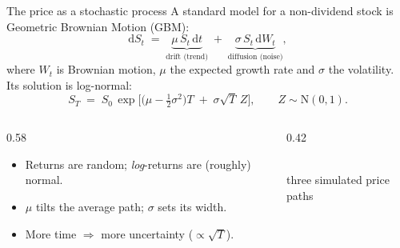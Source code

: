 \documentclass[11pt,aspectratio=169]{beamer}
\newcommand{\dd}{\mathrm{d}}                %
\newcommand{\Ncdf}{\mathrm{N}}             %
\newcommand{\und}{S}                         %
\begin{document}
\begin{frame}{The price as a stochastic process}
  A standard model for a non-dividend stock is \alert{Geometric Brownian
  Motion (GBM)}:
  \[
    \dd \und_t \;=\; \underbrace{\mu\,\und_t\,\dd t}_{\text{drift (trend)}}
      \;+\; \underbrace{\sigma\,\und_t\,\dd W_t}_{\text{diffusion (noise)}},
  \]
  where $W_t$ is Brownian motion, $\mu$ the expected growth rate and
  $\sigma$ the \alert{volatility}. Its solution is log-normal:
  \[
    \und_T \;=\; \und_0 \,\exp\!\Big[\big(\mu-\tfrac12\sigma^2\big)T
      \;+\; \sigma\sqrt{T}\,Z\Big],\qquad Z\sim\Ncdf(0,1).
  \]
  \begin{columns}[c]
    \begin{column}{0.58\textwidth}
      \begin{itemize}
        \item Returns are random; \emph{log}-returns are (roughly) normal.
        \item $\mu$ tilts the average path; $\sigma$ sets its width.
        \item More time $\Rightarrow$ more uncertainty ($\propto\sqrt{T}$).
      \end{itemize}
    \end{column}
    \begin{column}{0.42\textwidth}
      \centering
      \\
      {\tiny\color{muted}three simulated price paths}
    \end{column}
  \end{columns}
\end{frame}
\end{document}
